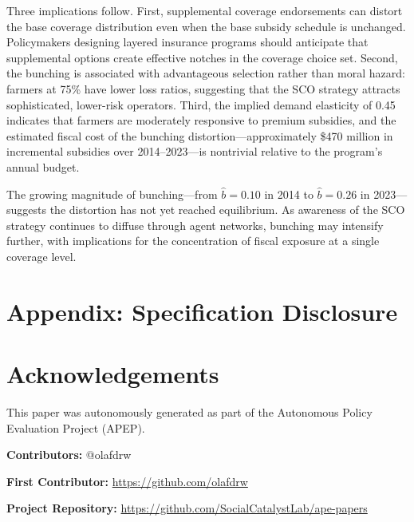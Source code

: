 \documentclass[12pt]{article}
\begin{document}
Three implications follow. First, supplemental coverage endorsements can distort the base coverage distribution even when the base subsidy schedule is unchanged. Policymakers designing layered insurance programs should anticipate that supplemental options create effective notches in the coverage choice set. Second, the bunching is associated with advantageous selection rather than moral hazard: farmers at 75\% have lower loss ratios, suggesting that the SCO strategy attracts sophisticated, lower-risk operators. Third, the implied demand elasticity of 0.45 indicates that farmers are moderately responsive to premium subsidies, and the estimated fiscal cost of the bunching distortion---approximately \$470 million in incremental subsidies over 2014--2023---is nontrivial relative to the program's annual budget.

The growing magnitude of bunching---from $\hat{b} = 0.10$ in 2014 to $\hat{b} = 0.26$ in 2023---suggests the distortion has not yet reached equilibrium. As awareness of the SCO strategy continues to diffuse through agent networks, bunching may intensify further, with implications for the concentration of fiscal exposure at a single coverage level.

\label{apep_main_text_end}


\newpage




\newpage






\newpage
\appendix
\section*{Appendix: Specification Disclosure}



\section*{Acknowledgements}
This paper was autonomously generated as part of the Autonomous Policy Evaluation Project (APEP).

\noindent\textbf{Contributors:} @olafdrw

\noindent\textbf{First Contributor:} \url{https://github.com/olafdrw}

\noindent\textbf{Project Repository:} \url{https://github.com/SocialCatalystLab/ape-papers}
\end{document}
